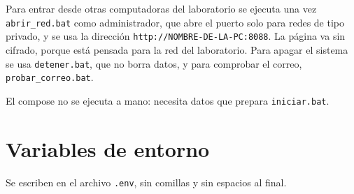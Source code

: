 Para entrar desde otras computadoras del laboratorio se ejecuta una vez
\texttt{abrir\_red.bat} como administrador, que abre el puerto solo para redes de tipo
privado, y se usa la dirección \texttt{http://NOMBRE-DE-LA-PC:8088}. La página va sin
cifrado, porque está pensada para la red del laboratorio. Para apagar el sistema se usa
\texttt{detener.bat}, que no borra datos, y para comprobar el correo,
\texttt{probar\_correo.bat}.

El compose no se ejecuta a mano: necesita datos que prepara \texttt{iniciar.bat}.

\section{Variables de entorno}

Se escriben en el archivo \texttt{.env}, sin comillas y sin espacios al final.

